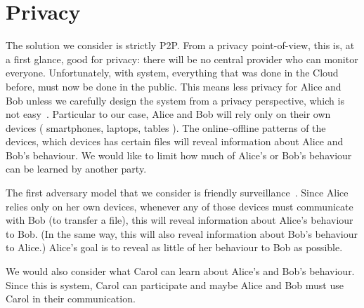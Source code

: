 \section{Privacy}%
\label{Privacy}


The solution we consider is strictly \ac{P2P}.
From a privacy point-of-view, this is, at a first glance, good for privacy: 
there will be no central provider who can monitor everyone.
Unfortunately, with  system, everything that was done in the Cloud 
before, must now be done in the public.
This means less privacy for Alice and Bob unless we carefully design the system 
from a privacy perspective, which is not easy~\cite{DevilInMetadata}.
Particular to our case, Alice and Bob will rely only on their own devices (\eg 
smartphones, laptops, tables \etc).
The online--offline patterns of the devices, which devices has certain files 
\etc will reveal information about Alice and Bob's behaviour.
We would like to limit how much of Alice's or Bob's behaviour can be learned by 
another party.

The first adversary model that we consider is friendly 
surveillance~\cite{FriendlySurveillance}.
Since Alice relies only on her own devices, whenever any of those devices must 
communicate with Bob (\eg to transfer a file), this will reveal information 
about Alice's behaviour to Bob.
(In the same way, this will also reveal information about Bob's behaviour to 
Alice.)
Alice's goal is to reveal as little of her behaviour to Bob as possible.

We would also consider what Carol can learn about Alice's and Bob's behaviour.
Since this is  system, Carol can participate and maybe Alice and Bob 
must use Carol in their communication.

